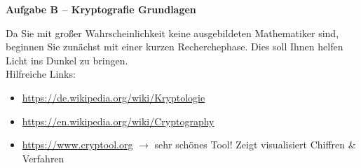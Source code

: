 \documentclass[paper=a4,fontsize=11pt]{scrartcl}%
\numberwithin{equation}{section}
\begin{document}
\begin{center}\Large{\textbf{Aufgabe B -- Kryptografie Grundlagen}}\end{center}\vskip0.25in
Da Sie mit großer Wahrscheinlichkeit keine ausgebildeten Mathematiker sind, beginnen Sie zunächst mit einer kurzen Recherchephase. Dies soll Ihnen helfen Licht ins Dunkel zu bringen.\\
Hilfreiche Links:
\begin{itemize}
	\item \url{https://de.wikipedia.org/wiki/Kryptologie}
	\item \url{https://en.wikipedia.org/wiki/Cryptography}
	\item \url{https://www.cryptool.org} $\rightarrow$ sehr schönes Tool! Zeigt visualisiert Chiffren \& Verfahren
\end{itemize}
\end{document}
